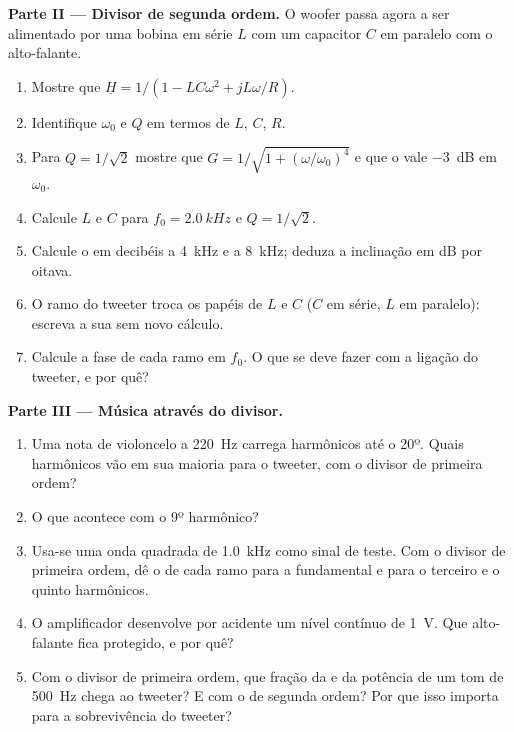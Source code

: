 \begin{problem}
\medskip
\noindent\textbf{Parte II --- Divisor de segunda ordem.}
O woofer passa agora a ser alimentado por uma bobina em série $L$ com um capacitor $C$
em paralelo com o alto-falante.
\begin{enumerate}[resume]
  \item Mostre que $\underline H = 1/(1 - LC\omega^2 + jL\omega/R)$.
  \item Identifique $\omega_0$ e $Q$ em termos de $L$, $C$, $R$.
  \item Para $Q = 1/\sqrt2$ mostre que $G = 1/\sqrt{1 + (\omega/\omega_0)^4}$
        e que o  vale \qty{-3}{dB} em $\omega_0$.
  \item Calcule $L$ e $C$ para $f_0 = \qty{2.0}{kHz}$ e $Q = 1/\sqrt2$.
  \item Calcule o  em decibéis a \qty{4}{kHz} e a \qty{8}{kHz};
        deduza a inclinação em dB por oitava.
  \item O ramo do tweeter troca os papéis de $L$ e $C$ ($C$ em série,
        $L$ em paralelo): escreva a sua  sem novo
        cálculo.
  \item Calcule a fase de cada ramo em $f_0$. O que se deve fazer com a
        ligação do tweeter, e por quê?
\end{enumerate}

\medskip
\noindent\textbf{Parte III --- Música através do divisor.}
\begin{enumerate}[resume]
  \item Uma nota de violoncelo a \qty{220}{Hz} carrega harmônicos até o 20º.
        Quais harmônicos vão em sua maioria para o tweeter, com o divisor
        de primeira ordem?
  \item O que acontece com o 9º harmônico?
  \item Usa-se uma onda quadrada de \qty{1.0}{kHz} como sinal de teste. Com o
        divisor de primeira ordem, dê o  de cada ramo para a
        fundamental e para o terceiro e o quinto harmônicos.
  \item O amplificador desenvolve por acidente um nível contínuo de \qty{1}{V}. Que
        alto-falante fica protegido, e por quê?
  \item Com o divisor de primeira ordem, que fração da 
        e da potência de um tom de \qty{500}{Hz} chega ao tweeter?
        E com o de segunda ordem? Por que isso importa para a
        sobrevivência do tweeter?
\end{enumerate}


\end{problem}
